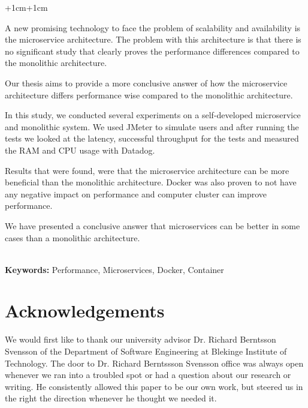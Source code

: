 \documentclass[a4paper,oneside]{bth}
\begin{document}
\abstract
\begin{changemargin}{+1cm}{+1cm}
\noindent

\par\vspace {0.5cm}
A new promising technology to face the problem of scalability and availability is the microservice architecture. The problem with this architecture is that there is no significant study that clearly proves the performance differences compared to the monolithic architecture.

\par\vspace {0.5cm}
Our thesis aims to provide a more conclusive answer of how the microservice architecture differs performance wise compared to the monolithic architecture.

\par\vspace {0.5cm}
In this study, we conducted several experiments on a self-developed microservice and monolithic system. We used JMeter to simulate users and after running the tests we looked at the latency, successful throughput for the tests and measured the RAM and CPU usage with Datadog.

\par\vspace {0.5cm}
Results that were found, were that the microservice architecture can be more beneficial than the monolithic architecture. Docker was also proven to not have any negative impact on performance and computer cluster can improve performance.

\par\vspace {0.5cm}
We have presented a conclusive answer that microservices can be better in some cases than a monolithic architecture.
\par\vspace {1cm}
\noindent\\
\textbf{Keywords:} Performance, Microservices, Docker, Container

\end{changemargin}


\section*{Acknowledgements}
We would first like to thank our university advisor Dr. Richard Berntsson Svensson of the Department of Software Engineering at Blekinge Institute of Technology. The door to Dr. Richard Berntssson Svensson office was always open whenever we ran into a troubled spot or had a question about our research or writing. He consistently allowed this paper to be our own work, but steered us in the right the direction whenever he thought we needed it.
\end{document}

